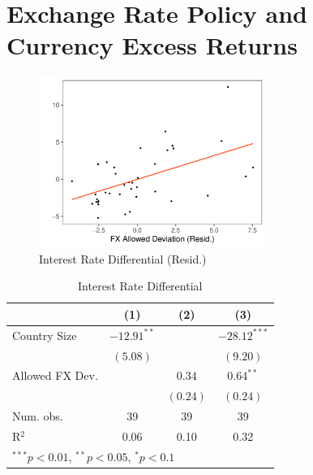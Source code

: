 \documentclass[12pt,english,round]{article}
\begin{document}
\section{Exchange Rate Policy and Currency Excess Returns}


\begin{figure}[htp!]
    \centering
    \caption{Interest Rate Differential (Resid.)}
    \includegraphics[width=0.66\textwidth]{Figure_FP_ERA.pdf}
\end{figure}

\vspace{1em}

\begin{table}[htp]
\begin{center}
\caption{Interest Rate Differential}
\begin{tabular}{l c c c }
\hline
 & (1) & (2) & (3) \\
\hline
Country Size            & $-12.91^{**}$ &             & $-28.12^{***}$ \\
                        & $(5.08)$      &             & $(9.20)$       \\
Allowed FX Dev.         &               & $0.34$      & $0.64^{**}$    \\
                        &               & $(0.24)$    & $(0.24)$       \\
\hline
Num. obs.               & 39            & 39          & 39             \\
R$^2$                   & 0.06          & 0.10        & 0.32           \\
\hline
\multicolumn{4}{l}{\scriptsize{$^{***}p<0.01$, $^{**}p<0.05$, $^*p<0.1$}}
\end{tabular}
\end{center}
\end{table}


\clearpage
\end{document}
